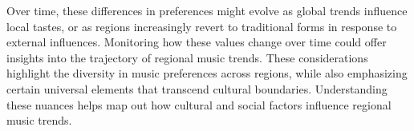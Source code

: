 \begin{itemize}
Over time, these differences in preferences might evolve as global trends influence local tastes, or as regions increasingly revert to traditional forms in response to external influences.
Monitoring how these values change over time could offer insights into the trajectory of regional music trends.
These considerations highlight the diversity in music preferences across regions, while also emphasizing certain universal elements that transcend cultural boundaries. Understanding these nuances helps map out how cultural and social factors influence regional music trends.
\end{itemize}
